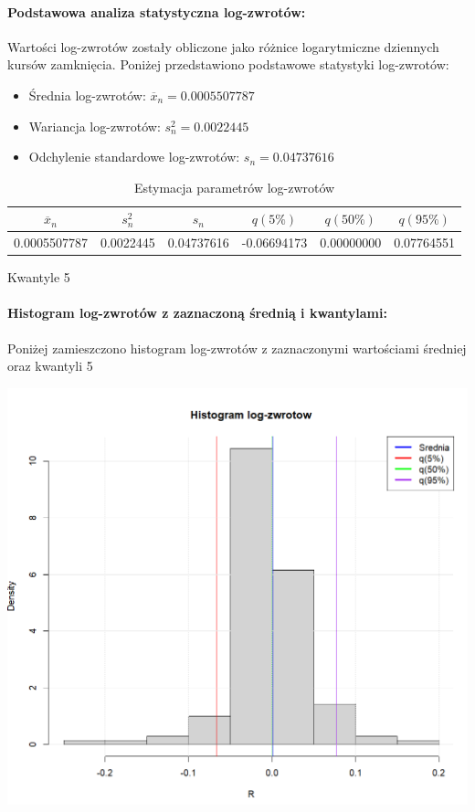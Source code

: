 \documentclass[a4paper,11pt]{article}
\begin{document}
\paragraph{Podstawowa analiza statystyczna log-zwrotów:}

Wartości log-zwrotów zostały obliczone jako różnice logarytmiczne dziennych kursów zamknięcia. Poniżej przedstawiono podstawowe statystyki log-zwrotów:
\begin{itemize}
    \item Średnia log-zwrotów: $\overline{x}_n = 0.0005507787$
    \item Wariancja log-zwrotów: $s^2_n = 0.0022445$
    \item Odchylenie standardowe log-zwrotów: $s_n = 0.04737616$
\end{itemize}

\begin{table}[h!]
\centering
\caption{Estymacja parametrów log-zwrotów}
\begin{tabular}{|c|c|c|c|c|c|}
\hline
$\overline{x}_n$ & $s^2_n$ & $s_n$ & $q(5\%)$ & $q(50\%)$ & $q(95\%)$ \\ \hline
0.0005507787 & 0.0022445 & 0.04737616 & -0.06694173 & 0.00000000 & 0.07764551 \\ \hline
\end{tabular}
\end{table}

Kwantyle 5%

\paragraph{Histogram log-zwrotów z zaznaczoną średnią i kwantylami:}

Poniżej zamieszczono histogram log-zwrotów z zaznaczonymi wartościami średniej oraz kwantyli 5%

\centerline{\includegraphics[width=14cm]{./Janek/histogram logzwrotow.png}}
\end{document}
